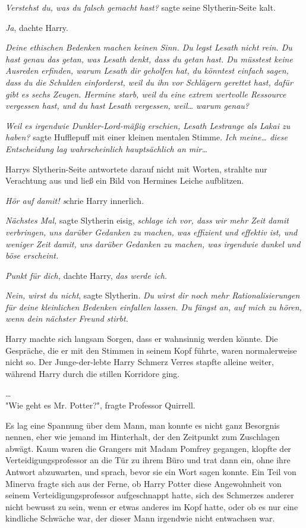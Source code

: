 {\emph{Verstehst du, was du falsch gemacht hast?} sagte seine Slytherin-Seite kalt.

\emph{Ja}, dachte Harry.

\emph{Deine ethischen Bedenken machen keinen Sinn. Du legst Lesath nicht rein. Du hast genau das getan, was Lesath denkt, dass du getan hast. Du müsstest keine Ausreden erfinden, warum Lesath dir geholfen hat, du könntest einfach sagen, dass du die Schulden einforderst, weil du ihn vor Schlägern gerettet hast, dafür gibt es sechs Zeugen. Hermine starb, weil du eine extrem wertvolle Ressource vergessen hast, und du hast Lesath vergessen, weil… warum genau?}

\emph{Weil es irgendwie Dunkler-Lord-mäßig erschien, Lesath Lestrange als Lakai zu haben?} sagte Hufflepuff mit einer kleinen mentalen Stimme. \emph{Ich meine… diese Entscheidung lag wahrscheinlich hauptsächlich an mir…}

Harrys Slytherin-Seite antwortete darauf nicht mit Worten, strahlte nur Verachtung aus und ließ ein Bild von Hermines Leiche aufblitzen.

\emph{Hör auf damit! s}chrie Harry innerlich.

\emph{Nächstes Mal,} sagte Slytherin eisig, \emph{schlage ich vor, dass wir mehr Zeit damit verbringen, uns darüber Gedanken zu machen, was effizient und effektiv ist, und weniger Zeit damit, uns darüber Gedanken zu machen, was irgendwie dunkel und böse erscheint.}

\emph{Punkt für dich,} dachte Harry, \emph{das werde ich.}

\emph{Nein, wirst du nicht}, sagte Slytherin. \emph{Du wirst dir noch mehr Rationalisierungen für deine kleinlichen Bedenken einfallen lassen. Du fängst an, auf mich zu hören, wenn dein nächster Freund stirbt.}

Harry machte sich langsam Sorgen, dass er wahnsinnig werden könnte. Die Gespräche, die er mit den Stimmen in seinem Kopf führte, waren normalerweise nicht so. Der Junge-der-lebte Harry Schmerz Verres stapfte alleine weiter, während Harry durch die stillen Korridore ging.

…\\ "Wie geht es Mr. Potter?", fragte Professor Quirrell.

Es lag eine Spannung über dem Mann, man konnte es nicht ganz Besorgnis nennen, eher wie jemand im Hinterhalt, der den Zeitpunkt zum Zuschlagen abwägt. Kaum waren die Grangers mit Madam Pomfrey gegangen, klopfte der Verteidigungsprofessor an die Tür zu ihrem Büro und trat dann ein, ohne ihre Antwort abzuwarten, und sprach, bevor sie ein Wort sagen konnte. Ein Teil von Minerva fragte sich aus der Ferne, ob Harry Potter diese Angewohnheit von seinem Verteidigungsprofessor aufgeschnappt hatte, sich des Schmerzes anderer nicht bewusst zu sein, wenn er etwas anderes im Kopf hatte, oder ob es nur eine kindliche Schwäche war, der dieser Mann irgendwie nicht entwachsen war.

}
